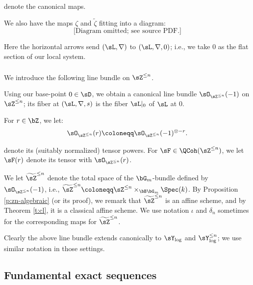  denote the canonical maps.

We also have the maps $\zeta$ and $\widetilde{\zeta}$ fitting into
a diagram:
%
\[
\text{[Diagram omitted; see source PDF.]}
\]

 Here the horizontal arrows send
$(\sL,\nabla)$ to $(\sL,\nabla,0)$; i.e., we
take $0$ as the flat section of our local system.

\subsubsection{}\label{sss:z-pic}

We introduce the following line bundle on $\sZ^{\leq n}$.

Using our base-point $0 \in \sD$, we obtain a canonical line bundle
$\sO_{\sZ^{\leq n}}(-1)$ on $\sZ^{\leq n}$; its fiber at
$(\sL,\nabla,s)$ is the fiber $\sL|_0$ of $\sL$ at $0$.

For $r \in \bZ$, we let:
%
\[
\sO_{\sZ^{\leq n}}(r) \coloneqq \sO_{\sZ^{\leq n}}(-1)^{\otimes -r}.
\]

 denote its (suitably normalized) tensor powers.
For $\sF \in \QCoh(\sZ^{\leq n})$, we let
$\sF(r)$ denote its tensor with $\sO_{\sZ^{\leq n}}(r)$.

We let $\widetilde{\sZ}^{\leq n}$ denote the total space of the $\bG_m$-bundle
defined by $\sO_{\sZ^{\leq n}}(-1)$, i.e.,
$\widetilde{\sZ}^{\leq n} \coloneqq \sZ^{\leq n} \times_{\bB \bG_m} \Spec(k)$.
By Proposition \ref{p:zn-algebraic} (or its proof), we remark that
$\widetilde{\sZ}^{\leq n}$ is an affine scheme, and by Theorem \ref{t:cl},
it is a classical affine scheme. We use notation $\iota$ and $\delta_n$
sometimes for the corresponding maps for $\widetilde{\sZ}^{\leq n}$.

\begin{rem}
\notready

Clearly the above line bundle extends canonically to $\sY_{\log}$ and
$\sY_{\log}^{\leq n}$; we use similar notation in those settings.

\end{rem}

\subsection{Fundamental exact sequences}\label{ss:fund}

\subsubsection{}

